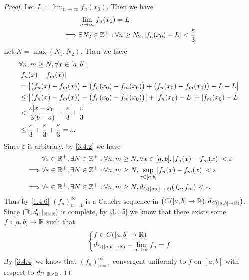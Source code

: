 \begin{proof}
  Let \(L = \lim_{n \to \infty} f_n(x_0)\).
  Then we have
  \begin{align*}
             & \lim_{n \to \infty} f_n(x_0) = L                                                       \\
    \implies & \exists N_2 \in \mathbb{Z}^+ : \forall n \geq N_2, \left\lvert f_n(x_0) - L\right\rvert < \dfrac{\varepsilon}{3}
  \end{align*}
  Let \(N = \max(N_1, N_2)\).
  Then we have
  \begin{align*}
     & \forall n, m \geq N, \forall x \in [a, b],                                                                     \\
     & \abs{f_n(x) - f_m(x)}                                                                                          \\
     & = \abs{\big(f_n(x) - f_m(x)\big) - \big(f_n(x_0) - f_m(x_0)\big) + \big(f_n(x_0) - f_m(x_0)\big) + L - L}      \\
     & \leq \abs{\big(f_n(x) - f_m(x)\big) - \big(f_n(x_0) - f_m(x_0)\big)} + \abs{f_n(x_0) - L} + \abs{f_m(x_0) - L} \\
     & < \dfrac{\varepsilon \abs{x - x_0}}{3(b - a)} + \dfrac{\varepsilon}{3} + \dfrac{\varepsilon}{3}                \\
     & \leq \dfrac{\varepsilon}{3} + \dfrac{\varepsilon}{3} + \dfrac{\varepsilon}{3} = \varepsilon.
  \end{align*}
  Since \(\varepsilon\) is arbitrary, by \cref{3.4.2} we have
  \begin{align*}
             & \forall \varepsilon \in \R^+, \exists N \in \Z^+ : \forall n, m \geq N, \forall x \in [a, b], \abs{f_n(x) - f_m(x)} < \varepsilon \\
    \implies & \forall \varepsilon \in \R^+, \exists N \in \Z^+ : \forall n, m \geq N, \sup_{x \in [a, b]}\abs{f_n(x) - f_m(x)} < \varepsilon    \\
    \implies & \forall \varepsilon \in \R^+, \exists N \in \Z^+ : \forall n, m \geq N, d_{C([a, b] \to \R)}(f_n, f_m) < \varepsilon.
  \end{align*}
  Thus by \cref{1.4.6} \((f_n)_{n = 1}^\infty\) is a Cauchy sequence in \(\big(C([a, b] \to \mathbb{R}), d_{C([a, b] \to \mathbb{R})}\big)\).
  Since \((\mathbb{R}, d_{l^1}|_{\mathbb{R} \times \mathbb{R}})\) is complete, by \cref{3.4.5} we know that there exists some \(f : [a, b] \to \mathbb{R}\) such that
  \[
    \begin{dcases}
      f \in C([a, b] \to \mathbb{R}) \\
      d_{C([a, b] \to \mathbb{R})} - \lim_{n \to \infty} f_n = f
    \end{dcases}
  \]
  By \cref{3.4.4} we know that \((f_n)_{n = 1}^\infty\) convergent uniformly to \(f\) on \([a, b]\) with respect to \(d_{l^1}|_{\mathbb{R} \times \mathbb{R}}\).


\end{proof}
